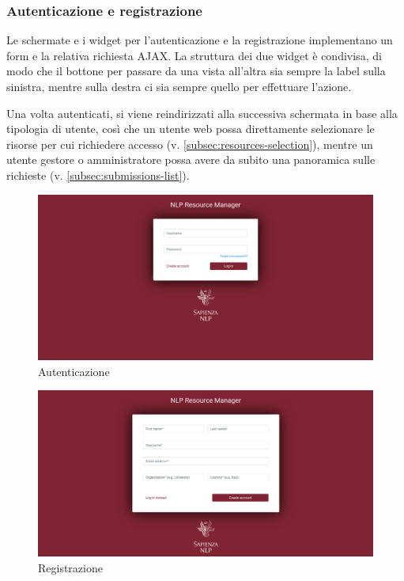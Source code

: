 \subsubsection{Autenticazione e registrazione}
Le schermate e i widget per l'autenticazione e la registrazione implementano un
form e la relativa richiesta AJAX. La struttura dei due widget è condivisa, di
modo che il bottone per passare da una vista all'altra sia sempre la label sulla
sinistra, mentre sulla destra ci sia sempre quello per effettuare l'azione.

Una volta autenticati, si viene reindirizzati alla successiva schermata in base
alla tipologia di utente, così che un utente web possa direttamente selezionare
le risorse per cui richiedere accesso (v. \autoref{subsec:resources-selection}),
mentre un utente gestore o amministratore possa avere da subito una panoramica
sulle richieste (v. \autoref{subsec:submissions-list}).

\begin{figure}[H]
	\centering
	\includegraphics[width=\textwidth]{assets/ui/login.png}
	\caption{Autenticazione}
	\label{fig:login}
\end{figure}

\begin{figure}[H]
	\centering
	\includegraphics[width=\textwidth]{assets/ui/signup.png}
	\caption{Registrazione}
	\label{fig:signup}
\end{figure}

